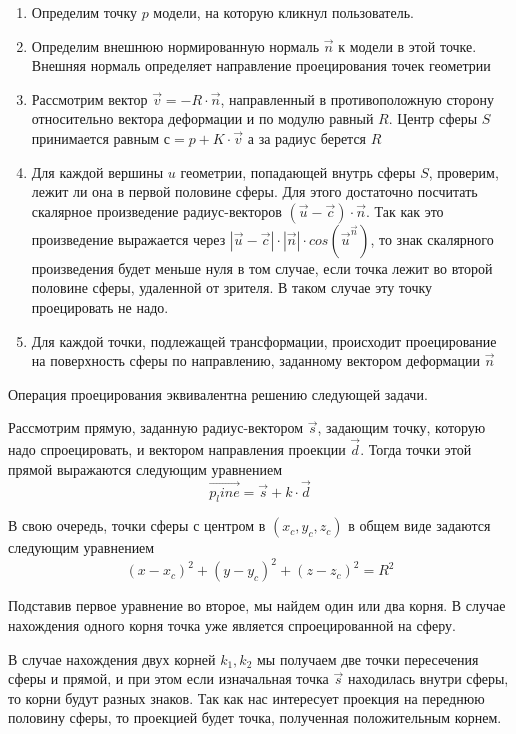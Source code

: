 \documentclass[12pt, a4paper]{article}
\begin{document}
\begin{enumerate}
    \item Определим точку $p$ модели, на которую кликнул пользователь.
    \item Определим внешнюю нормированную нормаль $\vec{n}$ к модели в этой
    точке. Внешняя нормаль определяет направление проецирования точек геометрии
    \item Рассмотрим вектор $\vec{v} = - R \cdot \vec{n}$,
    направленный в противоположную сторону относительно вектора деформации и по
    модулю равный $R$. Центр сферы $S$ принимается равным $с = p + K \cdot \vec{v}$
    а за радиус берется $R$
    \item Для каждой вершины $u$ геометрии, попадающей внутрь сферы $S$, проверим,
    лежит ли она в первой половине сферы. Для этого достаточно посчитать
    скалярное произведение радиус-векторов $(\vec{u}-\vec{c}) \cdot \vec{n}$. Так как это
    произведение выражается через $|\vec{u}-\vec{c}| \cdot |\vec{n}| \cdot
    cos(\vec{u} ^
    \vec{n})$, то знак скалярного произведения будет меньше нуля в том случае,
    если точка лежит во второй половине сферы, удаленной от зрителя. В таком
    случае эту точку проецировать не надо.
    \item Для каждой точки, подлежащей трансформации, происходит проецирование на
    поверхность сферы по направлению, заданному вектором деформации $\vec{n}$
\end{enumerate}

Операция проецирования эквивалентна решению следующей задачи.

Рассмотрим прямую, заданную радиус-вектором $\vec{s}$, задающим точку, которую
надо спроецировать, и вектором направления проекции $\vec{d}$. Тогда точки этой
прямой выражаются следующим уравнением
$$ \vec{p_line} = \vec{s} + k \cdot \vec{d} $$

В свою очередь, точки сферы с центром в $(x_c, y_c, z_c)$ в общем виде задаются
следующим уравнением
$$ (x-x_c)^2 + (y-y_c)^2 + (z-z_c)^2 = R^2 $$

Подставив первое уравнение во второе, мы найдем один или два корня. В случае
нахождения одного корня точка уже является спроецированной на сферу.

В случае нахождения двух корней $k_1, k_2$ мы получаем две точки пересечения
сферы и прямой, и при этом если изначальная точка $\vec{s}$ находилась внутри
сферы, то корни будут разных знаков. Так как нас интересует проекция на переднюю
половину сферы, то проекцией будет точка, полученная положительным корнем.
\end{document}
